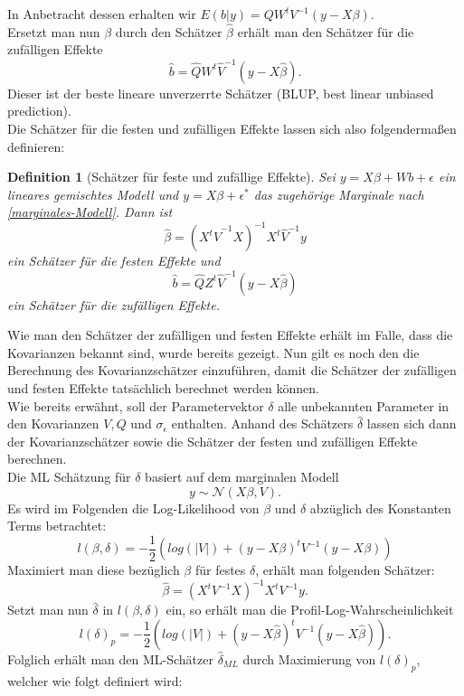 \documentclass[%
thesis=student,%
coverpage=false,%
titlepage=false,%
headmarks=true, %
german,%
font=libertine, %
math=newpxtx, %
BCOR=5mm,%
coverBCOR=11mm%
]{tumbook}
\theoremstyle{break}
\newtheorem{definition}{Definition}[section]
\begin{document}
In Anbetracht dessen erhalten wir $E(b|y) = Q W^tV^{-1}(y-X\beta)$. \\
Ersetzt man nun $\beta$ durch den Schätzer $\hat{\beta}$ erhält man den Schätzer für die zufälligen Effekte $$\hat{b} = \hat{Q} W^t\hat{V}^{-1}(y-X\hat{\beta}).$$ Dieser ist der beste lineare unverzerrte Schätzer (BLUP, best linear unbiased prediction).\\
Die Schätzer für die festen und zufälligen Effekte lassen sich also folgendermaßen definieren:
\begin{definition}[Schätzer für feste und zufällige Effekte]
	Sei $y = X\beta + Wb + \epsilon$ ein lineares gemischtes Modell und $y=X\beta + \epsilon^*$ das zugehörige Marginale nach \ref{marginales-Modell}.
	Dann ist $$\hat{\beta} = (X^t \hat{V}^{-1}X)^{-1}X^t \hat{V}^{-1}y$$ ein Schätzer für die festen Effekte und $$ \hat{b} = \hat{Q} Z^t\hat{V}^{-1}(y-X\hat{\beta})$$ ein Schätzer für die zufälligen Effekte.
\end{definition}\noindent
Wie man den Schätzer der zufälligen und festen Effekte erhält im Falle, dass die Kovarianzen bekannt sind, wurde bereits gezeigt. Nun gilt es noch den die Berechnung des Kovarianzschätzer einzuführen, damit die Schätzer der zufälligen und festen Effekte tatsächlich berechnet werden können. \\
Wie bereits erwähnt, soll der Parametervektor $\delta$ alle unbekannten Parameter in den Kovarianzen $V, Q$ und $\sigma_\epsilon$ enthalten. Anhand des Schätzers $\hat{\delta}$  lassen sich dann der Kovarianzschätzer sowie die Schätzer der festen und zufälligen Effekte berechnen.\\ 
Die ML Schätzung für $\delta$ basiert auf dem marginalen Modell 
$$y \sim \mathcal{N}(X\beta,V).$$
Es wird im Folgenden die Log-Likelihood von $\beta$ und $\delta$ abzüglich des Konstanten Terms betrachtet: 
$$l(\beta,\delta) = - \frac{1}{2} (log(|V|)+(y-X\beta)^tV^{-1}(y-X\beta))$$
Maximiert man diese bezüglich $\beta$ für festes $\delta$, erhält man folgenden Schätzer:
$$ \hat{\beta} = (X^tV^{-1}X)^{-1}X^tV^{-1}y.$$
Setzt man nun $\hat{\delta}$ in $l(\beta,\delta)$ ein, so erhält man die Profil-Log-Wahrscheinlichkeit 
$$ l(\delta)_p = - \frac{1}{2} (log(|V|)+(y-X\hat{\beta})^tV^{-1}(y-X\hat{\beta})).$$
Folglich erhält man den ML-Schätzer $\hat{\delta}_{ML}$ durch Maximierung von $l(\delta)_p$, welcher wie folgt definiert wird:
\end{document}
